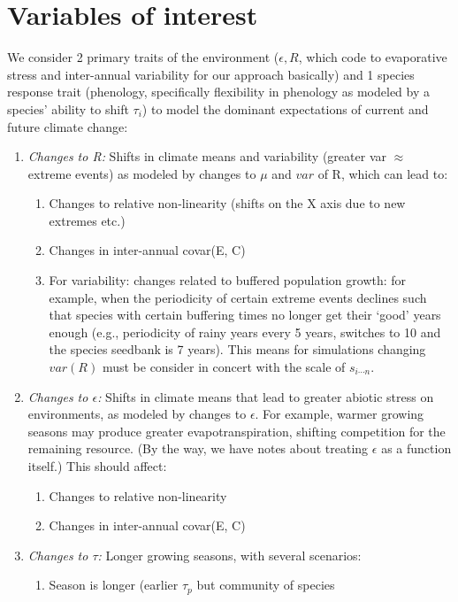 \documentclass[11pt,a4paper,oneside]{article}
\begin{document}
\section{Variables of interest}
\noindent We
consider 2 primary traits of the environment (\(\epsilon, R\), which
code to evaporative stress and inter-annual variability for our approach basically) and 1
species response trait (phenology, specifically flexibility in
phenology as modeled by a species' ability to shift \(\tau_{i}\)) to model
the dominant expectations of current and future climate change:
\begin{enumerate}
\item \emph{Changes to R:} Shifts in climate means and variability (greater var \(\approx\)
  extreme events) as modeled by changes to \(\mu\) and \(var\) of
    R,
  which can lead to:
\begin{enumerate}
\item Changes to relative non-linearity (shifts on the X axis due to
  new extremes etc.)
\item Changes in inter-annual covar(E, C)
\item For variability: changes related to buffered population growth:
  for example, when the periodicity of certain extreme events declines
  such that species with certain buffering times no longer get their
  `good' years enough (e.g., periodicity of rainy years every 5 years,
  switches to 10 and the species seedbank is 7 years). This means for
  simulations changing \(var(R)\) must be consider in concert with the
  scale of \(s_{i\cdots n}\).
\end{enumerate}
\item \emph{Changes to \(\epsilon\):} Shifts in climate means that lead to greater abiotic stress on
  environments, as modeled by changes to  \(\epsilon\). For example,
  warmer growing seasons may produce greater evapotranspiration,
  shifting competition for the remaining resource. (By the way, we
  have notes about treating \(\epsilon\) as a function itself.) This should
  affect:
\begin{enumerate}
\item Changes to relative non-linearity
\item Changes in inter-annual covar(E, C)
\end{enumerate}
\item \emph{Changes to \(\tau\):} Longer growing seasons, with several scenarios:
\begin{enumerate}
\item Season is longer (earlier \(\tau_{p}\) but community of species

\end{enumerate}
\end{enumerate}
\end{document}
